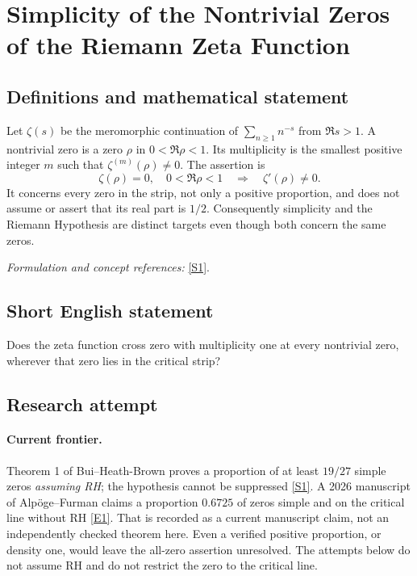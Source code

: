 \documentclass[11pt,a4paper]{article}
\newcommand{\sref}[2]{\hyperlink{source:#1:#2}{[S#2]}}
\newcommand{\eref}[2]{\hyperlink{extra:#1:#2}{[E#2]}}
\newif\ifshowcatalogue
\newcommand{\cataloguescope}[1]{\ifshowcatalogue
 \paragraph{Exact scope in the supplied catalogue.}
 \begin{quote}\small #1\end{quote}\fi}
\numberwithin{equation}{section}
\begin{document}
\setcounter{section}{0}
\clearpage
\section*{\texorpdfstring{Simplicity of the Nontrivial Zeros of the Riemann Zeta Function}{Simplicity of the Nontrivial Zeros of the Riemann Zeta Function}}\label{statement}
\subsection{Definitions and mathematical statement}
Let $\zeta(s)$ be the meromorphic continuation of $\sum_{n\ge1}n^{-s}$ from $\Re s>1$. A nontrivial zero is a zero $\rho$ in $0<\Re\rho<1$. Its multiplicity is the smallest positive integer $m$ such that $\zeta^{(m)}(\rho)\ne0$. The assertion is
\[
 \zeta(\rho)=0,\quad0<\Re\rho<1\quad\Longrightarrow\quad\zeta'(\rho)\ne0.
\]
It concerns every zero in the strip, not only a positive proportion, and does not assume or assert that its real part is $1/2$. Consequently simplicity and the Riemann Hypothesis are distinct targets even though both concern the same zeros.
\par\smallskip\textit{Formulation and concept references:} \sref{statement}{1}.
\cataloguescope{Prove that zeta'(rho) is nonzero for every nontrivial zero rho of the Riemann zeta function; equivalently, every nontrivial zero of zeta(s) has multiplicity exactly one.}
\subsection{Short English statement}
Does the zeta function cross zero with multiplicity one at every nontrivial zero, wherever that zero lies in the critical strip?
\subsection{Research attempt}

\paragraph{Current frontier.}
Theorem 1 of Bui--Heath-Brown proves a proportion of at least $19/27$ simple
zeros \emph{assuming RH}; the hypothesis cannot be suppressed
\sref{statement}{1}. A 2026 manuscript of Alp\"oge--Furman claims a proportion
$0.6725$ of zeros simple and on the critical line without RH
\eref{statement}{1}. That is recorded as a current manuscript claim, not an
independently checked theorem here. Even a verified positive proportion,
or density one, would leave the all-zero assertion unresolved. The attempts
below do not assume RH and do not restrict the zero to the critical line.
\end{document}
